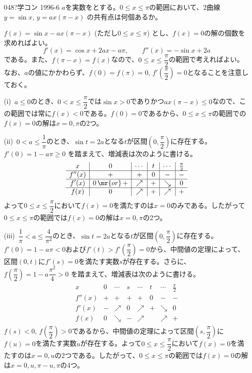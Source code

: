
\begin{thm}{048}{\hosi ?}{学コン 1996-6}
 $a$を実数をとする。$0\le x \le \pi$の範囲において、2曲線 $y=\sin x$, $y=ax(\pi-x)$ の共有点は何個あるか。
\end{thm}

$f(x)=\sin x -ax(\pi-x)$ (ただし$0\le x\le \pi$) とし、$f(x)=0$の解の個数を求めればよい。
\[ f'(x)=\cos x+2ax-a\pi, \qquad f''(x)=-\sin x + 2a \]
である。また、$f(\pi-x)=f(x)$なので、$0\le x\le \dfrac{\pi}{2}$の範囲で考えればよい。なお、$a$の値にかかわらず、$f(0)=f(\pi)=0$, $f'\left(\dfrac{\pi}{2}\right)=0$となることを注意しておく。

(i)~$a\le 0$のとき、$0< x\le \dfrac{\pi}{2}$では$\sin x>0$でありかつ$ax(\pi-x)\le 0$なので、この範囲では常に$f(x)<0$である。$f(0)=0$であるから、$0\le x\le \pi$の範囲での$f(x)=0$の解は$x=0, \pi$の2つ。

(ii)~$0<a\le\dfrac{1}{\pi}$のとき、$\sin t=2a$となる$t$が区間$\left(0, \dfrac{\pi}{2} \right)$に存在する。$f'(0)=1-a\pi\ge 0$ を踏まえて、増減表は次のように書ける。
\begin{align*}
 \begin{array}{c|c|c|c|c|c}
  x & 0 & \cdots & t & \cdots & \frac{\pi}{2} \\ \hline
  f''(x) & + & + & 0 & - & - \\ \hline
  f'(x) & 0 \,\mr{or}\, + & \nearrow & + & \searrow & 0 \\ \hline
  f(x) & 0 & \nearrow & + & \nearrow & + 
 \end{array}
\end{align*}
よって$0\le x\le \dfrac{\pi}{2}$において$f(x)=0$を満たすのは$x=0$のみである。したがって$0\le x\le \pi$の範囲では$f(x)=0$の解は$x=0, \pi$の2つ。

(iii)~$\dfrac{1}{\pi}<a\le\dfrac{4}{\pi^2}$のとき、$\sin t=2a$となる$t$が区間$\left(0, \dfrac{\pi}{2} \right)$に存在する。$f'(0)=1-a\pi< 0$および$f'(t)>f'\left(\dfrac{\pi}{2}\right)=0$から、中間値の定理によって、区間$(0,t)$に$f'(s)=0$を満たす実数$s$が存在する。さらに、$f\left(\dfrac{\pi}{2}\right)=1-a\dfrac{\pi^2}{4}>0$ を踏まえて、増減表は次のように書ける。
\begin{align*}
 \begin{array}{c|c|c|c|c|c|c|c}
  x & 0 & \cdots & s & \cdots & t & \cdots & \frac{\pi}{2} \\ \hline
  f''(x) & + & + & + & + & 0 & - & - \\ \hline
  f'(x) & - & \nearrow & 0 & \nearrow &  + & \searrow & 0 \\ \hline
  f(x) & 0 & \searrow & - & \nearrow & & \nearrow & +
 \end{array}
\end{align*}
$f(s)<0$, $f\left(\dfrac{\pi}{2}\right)>0$であるから、中間値の定理によって区間$\left(s, \dfrac{\pi}{2}\right)$に$f(u)=0$を満たす実数$u$が存在する。よって$0\le x\le\dfrac{\pi}{2}$において$f(x)=0$を満たすのは$x=0, u$の2つである。したがって、$0\le x\le \pi$の範囲では$f(x)=0$の解は$x=0, u, \pi-u, \pi$の4つ。

